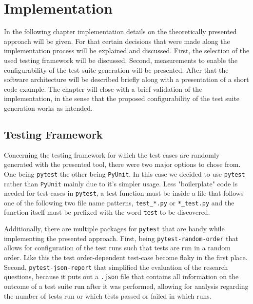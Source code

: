 \documentclass[
fancyheadings, %
%
%
]{stsreprt}
\begin{document}
\chapter{Implementation}\label{ch:imple}
In the following chapter implementation details on the theoretically presented approach will be given.
For that certain decisions that were made along the implementation process will be explained and discussed. 
First, the selection of the used testing framework will be discussed. 
Second, measurements to enable the configurability of the test suite generation will be presented.
After that the software architecture will be described briefly along with a presentation of a short code example. 
The chapter will close with a brief validation of the implementation, in the sense that the proposed configurability of the test suite generation works as intended. 



\section{Testing Framework}
Concerning the testing framework for which the test cases are randomly generated with the presented tool, there were two major options to chose from. 
One being \texttt{pytest} the other being \texttt{PyUnit}. In this case we decided to use \texttt{pytest} rather than \texttt{PyUnit} mainly due to it's simpler usage.
Less "boilerplate" code is needed for test cases in \texttt{pytest}, a test function must be inside a file that follows one of the following two file name patterns, \lstinline{test_*.py} or \lstinline{*_test.py} and the function itself must be prefixed with the word \lstinline{test} to be discovered. \par
Additionally, there are multiple packages for \texttt{pytest} that are handy while implementing the presented approach.
First, being \texttt{pytest-random-order} that allows for configuration of the test runs such that tests are run in a random order. 
Like this the test order-dependent test-case become flaky in the first place.
Second, \texttt{pytest-json-report} that simplified the evaluation of the research questions, because it puts out a \lstinline{.json} file that contains all information on the outcome of a test suite run after it was performed, allowing for analysis regarding the number of tests run or which tests passed or failed in which runs.
\end{document}
